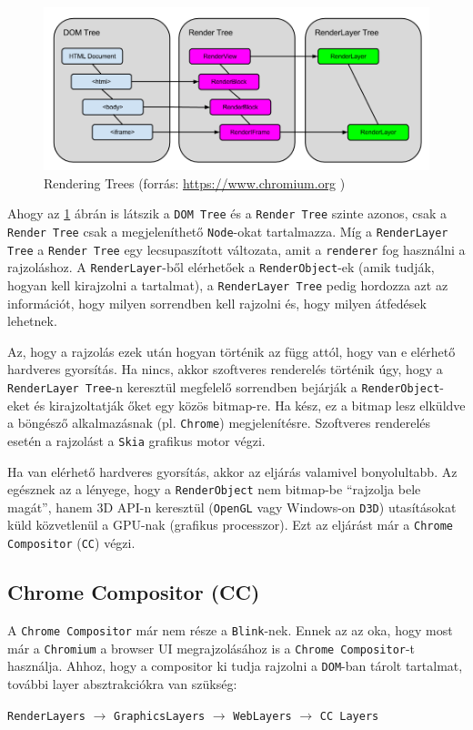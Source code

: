 \documentclass[12pt]{report}
\let\origurl\url
\renewcommand{\url}[1]{%
    \textcolor{blue}{\origurl{#1}}
}
\begin{document}
\begin{figure}[h]
    \centering
    \includegraphics[scale=0.46]{rendering_trees}
    \caption{
        \label{fig-rendering-trees}
        Rendering Trees (forrás: \url{https://www.chromium.org} \cite{bib-chromium-oopifs})
    }
\end{figure}

Ahogy az \ref{fig-rendering-trees} ábrán is látszik a \texttt{DOM Tree} és a
\texttt{Render Tree} szinte azonos, csak a \texttt{Render Tree} csak a megjeleníthető
\texttt{Node}-okat tartalmazza. Míg a \texttt{RenderLayer Tree} a \texttt{Render Tree} egy
lecsupaszított változata, amit a \texttt{renderer} fog használni a rajzoláshoz.
A \texttt{RenderLayer}-ből elérhetőek a \texttt{RenderObject}-ek (amik tudják, hogyan
kell kirajzolni a tartalmat), a \texttt{RenderLayer Tree} pedig hordozza azt az információt,
hogy milyen sorrendben kell rajzolni és, hogy milyen átfedések lehetnek.

Az, hogy a rajzolás ezek után hogyan történik az függ attól, hogy van e elérhető hardveres
gyorsítás. Ha nincs, akkor szoftveres renderelés történik úgy, hogy a \\
\texttt{RenderLayer Tree}-n keresztül megfelelő sorrendben bejárják a
\texttt{RenderObject}-eket és kirajzoltatják őket egy közös bitmap-re. Ha kész, ez a bitmap
lesz elküldve a böngésző alkalmazásnak (pl. \texttt{Chrome}) megjelenítésre. Szoftveres
renderelés esetén a rajzolást a \texttt{Skia} grafikus motor végzi.

Ha van elérhető hardveres gyorsítás, akkor az eljárás valamivel bonyolultabb. Az egésznek az
a lényege, hogy a \texttt{RenderObject} nem bitmap-be ``rajzolja bele magát'', hanem 3D API-n
keresztül (\texttt{OpenGL} vagy Windows-on \texttt{D3D}) utasításokat küld közvetlenül a
GPU-nak (grafikus processzor). Ezt az eljárást már a \texttt{Chrome Compositor} (\texttt{CC})
végzi.
\cite{bib-chromium-gpu, bib-chromium-oopifs}

\subsection{Chrome Compositor (CC)}
A \texttt{Chrome Compositor} már nem része a \texttt{Blink}-nek.
Ennek az az oka, hogy most már a \texttt{Chromium} a browser UI megrajzolásához is a
\texttt{Chrome Compositor}-t használja.
Ahhoz, hogy a compositor ki tudja rajzolni a \texttt{DOM}-ban tárolt tartalmat,
további layer absztrakciókra van szükség:
\begin{center}
    \texttt{RenderLayers} $\rightarrow$ \texttt{GraphicsLayers} $\rightarrow$
    \texttt{WebLayers} $\rightarrow$ \texttt{CC Layers}
\end{center}
\end{document}
